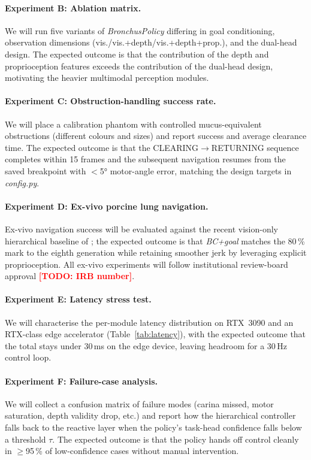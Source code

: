 \documentclass[journal,comsoc]{IEEEtran}
\newcommand{\TODO}[1]{\textcolor{red}{\textbf{[TODO: #1]}}}
\begin{document}
\paragraph{Experiment B: Ablation matrix.}
We will run five variants of \textit{BronchusPolicy} differing in
goal conditioning, observation dimensions (vis./vis.+depth/vis.+depth+prop.),
and the dual-head design. The expected outcome is that the
contribution of the depth and proprioception features exceeds the
contribution of the dual-head design, motivating the heavier
multimodal perception modules.

\paragraph{Experiment C: Obstruction-handling success rate.}
We will place a calibration phantom with controlled mucus-equivalent
obstructions (different colours and sizes) and report success and
average clearance time. The expected outcome is that the
CLEARING$\to$RETURNING sequence completes within 15 frames and the
subsequent navigation resumes from the saved breakpoint with $<$5°
motor-angle error, matching the design targets in
\textit{config.py}.

\paragraph{Experiment D: Ex-vivo porcine lung navigation.}
Ex-vivo navigation success will be evaluated against the recent
vision-only hierarchical baseline of \cite{longshort2026}; the
expected outcome is that \emph{BC+goal} matches the 80\,\% mark to
the eighth generation while retaining smoother jerk by leveraging
explicit proprioception. All ex-vivo experiments will follow
institutional review-board approval \TODO{IRB number}.

\paragraph{Experiment E: Latency stress test.}
We will characterise the per-module latency distribution on RTX~3090
and an RTX-class edge accelerator (Table~\ref{tab:latency}), with
the expected outcome that the total stays under 30\,ms on the edge
device, leaving headroom for a 30\,Hz control loop.

\paragraph{Experiment F: Failure-case analysis.}
We will collect a confusion matrix of failure modes (carina missed,
motor saturation, depth validity drop, etc.) and report how the
hierarchical controller falls back to the reactive layer when the
policy's task-head confidence falls below a threshold $\tau$. The
expected outcome is that the policy hands off control cleanly in
$\ge$95\,\% of low-confidence cases without manual intervention.
\end{document}
